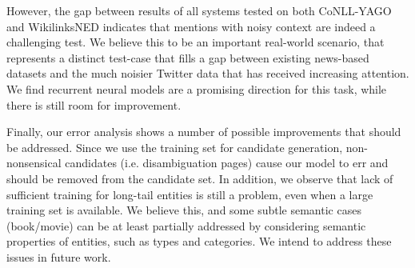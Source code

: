 \documentclass[11pt,letterpaper]{article}
\begin{document}
	However, the gap between results of all systems tested on both CoNLL-YAGO and WikilinksNED indicates that mentions with noisy context are indeed a challenging test. We believe this to be an important real-world scenario, that represents a distinct test-case that fills a gap between existing news-based datasets and the much noisier Twitter data \cite{ritter2011Named} that has received increasing attention. We find recurrent neural models are a promising direction for this task, while there is still room for improvement. 
	
	Finally, our error analysis shows a number of possible improvements that should be addressed. Since we use the training set for candidate generation, non-nonsensical candidates (i.e. disambiguation pages) cause our model to err and should be removed from the candidate set. In addition, we observe that lack of sufficient training for long-tail entities is still a problem, even when a large training set is available. We believe this, and some subtle semantic cases (book/movie) can be at least partially addressed by considering semantic properties of entities, such as types and categories. We intend to address these issues in future work.
	
	
	
	
\end{document}
